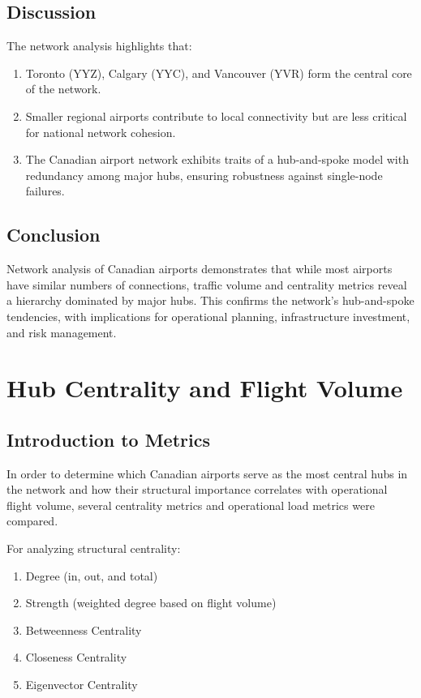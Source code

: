 \documentclass[9pt]{article}
\begin{document}
\subsection{Discussion}

The network analysis highlights that:

\begin{enumerate}[label=\arabic*.]
    \item Toronto (YYZ), Calgary (YYC), and Vancouver (YVR) form the central core of the network.
    \item Smaller regional airports contribute to local connectivity but are less critical for national network cohesion.
    \item The Canadian airport network exhibits traits of a hub-and-spoke model with redundancy among major hubs, ensuring robustness against single-node failures.
\end{enumerate}

\subsection{Conclusion}

Network analysis of Canadian airports demonstrates that while most airports have similar numbers of connections, traffic volume and centrality metrics reveal a hierarchy dominated by major hubs. This confirms the network’s hub-and-spoke tendencies, with implications for operational planning, infrastructure investment, and risk management.

\section{Hub Centrality and Flight Volume}

\subsection{Introduction to Metrics}

In order to determine which Canadian airports serve as the most central hubs in the network and how their structural importance correlates with operational flight volume, several centrality metrics and operational load metrics were compared.

For analyzing structural centrality:
\begin{enumerate}[label=\arabic*.]
    \item Degree (in, out, and total)
    \item Strength (weighted degree based on flight volume)
    \item Betweenness Centrality
    \item Closeness Centrality
    \item Eigenvector Centrality
\end{enumerate}
\end{document}
